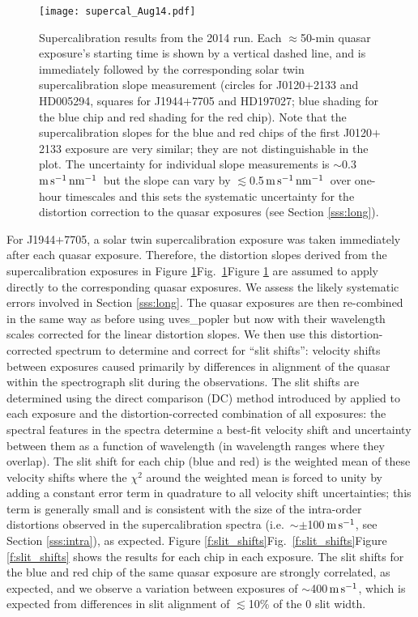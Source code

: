 \documentclass[fleqn,usenatbib,usedcolumn]{mnras}
\renewcommand{\la}{\lesssim} %
\newcommand{\Sref}[1]{Section \ref{#1}}
\newcommand{\Fref}[1]{\ifhmode \ifnum\spacefactor=1001 Figure \ref{#1}\else Fig.\ \ref{#1}\fi \else Figure \ref{#1}\fi}
\newcommand{\ms}{\ensuremath{\textrm{m\,s}^{-1}}}
\newcommand{\msnm}{\ensuremath{\ms\,\textrm{nm}^{-1}}}
\begin{document}
\begin{figure}
\begin{center}
\texttt{[image: supercal\_Aug14.pdf]}\vspace{-1em}
\caption{Supercalibration results from the 2014 run. Each $\approx$50-min quasar exposure's starting time is shown by a vertical dashed line, and is immediately followed by the corresponding solar twin supercalibration slope measurement (circles for J0120$+$2133 and HD005294, squares for J1944$+$7705 and HD197027; blue shading for the blue chip and red shading for the red chip). Note that the supercalibration slopes for the blue and red chips of the first J0120$+$2133 exposure are very similar; they are not distinguishable in the plot. The uncertainty for individual slope measurements is $\sim$0.3\,\msnm\ but the slope can vary by $\la$0.5\,\msnm\ over one-hour timescales and this sets the systematic uncertainty for the distortion correction to the quasar exposures (see \Sref{sss:long}).}
\label{f:scal_Aug14}
\end{center}
\end{figure}

For J1944$+$7705, a solar twin supercalibration exposure was taken immediately after each quasar exposure. Therefore, the distortion slopes derived from the supercalibration exposures in \Fref{f:scal_Aug14} are assumed to apply directly to the corresponding quasar exposures. We assess the likely systematic errors involved in \Sref{sss:long}. The quasar exposures are then re-combined in the same way as before using {\sc uves\_popler} but now with their wavelength scales corrected for the linear distortion slopes. We then use this distortion-corrected spectrum to determine and correct for ``slit shifts'': velocity shifts between exposures caused primarily by differences in alignment of the quasar within the spectrograph slit during the observations. The slit shifts are determined using the direct comparison (DC) method introduced by \citet{Evans:2013:173} applied to each exposure and the distortion-corrected combination of all exposures: the spectral features in the spectra determine a best-fit velocity shift and uncertainty between them as a function of wavelength (in wavelength ranges where they overlap). The slit shift for each chip (blue and red) is the weighted mean of these velocity shifts where the $\chi^2$ around the weighted mean is forced to unity by adding a constant error term in quadrature to all velocity shift uncertainties; this term is generally small and is consistent with the size of the intra-order distortions observed in the supercalibration spectra (i.e.\ $\sim\pm$100\,\ms, see \Sref{sss:intra}), as expected. \Fref{f:slit_shifts} shows the results for each chip in each exposure. The slit shifts for the blue and red chip of the same quasar exposure are strongly correlated, as expected, and we observe a variation between exposures of $\sim$400\,\ms, which is expected from differences in slit alignment of $\la$10\% of the 0 slit width.
\end{document}
